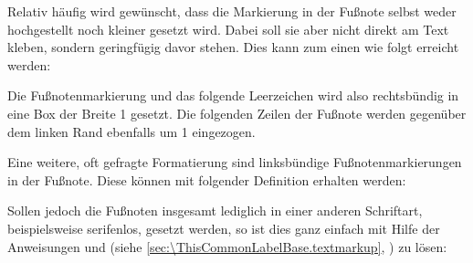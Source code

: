 \IfThisCommonFirstRun{\iftrue}{\csname iffalse\endcsname}%
  \begin{Example}
    Relativ häufig wird gewünscht, dass die Markierung in der
    Fußnote selbst weder hochgestellt noch kleiner gesetzt wird. Dabei soll
    sie aber nicht direkt am Text kleben, sondern geringfügig davor
    stehen. Dies kann zum einen wie folgt erreicht werden:
\begin{lstcode}
\end{lstcode}
    Die Fußnotenmarkierung und das folgende Leerzeichen wird also rechtsbündig
    in eine Box der Breite 1 gesetzt.  Die folgenden Zeilen der
    Fußnote werden gegenüber dem linken Rand ebenfalls um 1
    eingezogen.
  
    Eine weitere, oft gefragte Formatierung sind linksbündige
    Fußnotenmarkierungen in der Fußnote. Diese können mit folgender Definition
    erhalten werden:
\begin{lstcode}
\end{lstcode}
  
    Sollen jedoch die Fußnoten insgesamt lediglich in einer anderen
    Schriftart, beispielsweise serifenlos, gesetzt werden, so ist dies ganz
    einfach mit Hilfe der Anweisungen
     und
     (siehe
    \autoref{sec:\ThisCommonLabelBase.textmarkup},
    ) zu lösen:
\begin{lstcode}
\end{lstcode}%
  \end{Example}%
\fi%
%
%
\EndIndexGroup
\EndIndexGroup

